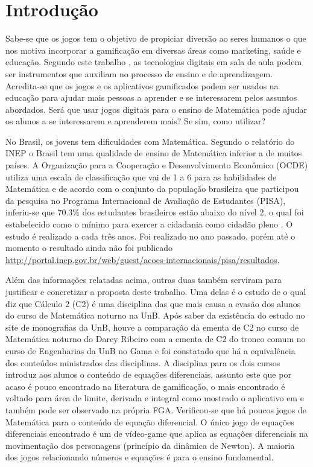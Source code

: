 \chapter[Introdução]{Introdução}


Sabe-se que os jogos tem o objetivo de propiciar diversão ao seres humanos o que nos motiva incorporar a gamificação em diversas áreas como marketing, saúde e educação. Segundo este trabalho \cite{revbibmatgam}, as tecnologias digitais em sala de aula podem ser instrumentos que auxiliam no processo de ensino e de aprendizagem. Acredita-se que os jogos e os aplicativos gamificados podem ser usados na educação para ajudar mais pessoas a aprender e se interessarem pelos assuntos abordados. Será que usar jogos digitais para o ensino de Matemática pode ajudar os alunos a se interessarem e aprenderem mais? Se sim, como utilizar? 

No Brasil, os jovens tem dificuldades com Matemática. Segundo o relatório do INEP \cite{inep2015nivelcidadania} o Brasil tem uma qualidade de ensino de Matemática inferior a de muitos países. A Organização para a Cooperação e Desenvolvimento Econômico (OCDE) utiliza uma escala de classificação que vai de 1 a 6 para as habilidades de Matemática e de acordo com o conjunto da população brasileira que participou da pesquisa no Programa Internacional de Avaliação de Estudantes (PISA), inferiu-se que 70.3\% dos estudantes brasileiros estão abaixo do nível 2, o qual foi estabelecido como o mínimo para exercer a cidadania como cidadão pleno \cite{inep2015nivelcidadania}.
O estudo é realizado a cada três anos. Foi realizado no ano passado, porém até o momento o resultado ainda não foi publicado \url{http://portal.inep.gov.br/web/guest/acoes-internacionais/pisa/resultados}.

Além das informações relatadas acima, outras duas também serviram para justificar e concretizar a proposta deste trabalho. Uma delas é o estudo de \cite{evasaoC2} o qual diz que Cálculo 2 (C2) é uma disciplina das que mais causa a evasão dos alunos do curso de Matemática noturno na UnB. Após saber da existência do estudo no site de monografias da UnB, houve a comparação da ementa de C2 no curso de Matemática noturno do Darcy Ribeiro com a ementa de C2 do tronco comum no curso de Engenharias da UnB no Gama e foi constatado que há a equivalência dos conteúdos ministrados das disciplinas. A disciplina para os dois cursos introduz aos alunos o conteúdo de equações diferenciais, assunto este que por acaso é pouco encontrado na literatura de gamificação, o mais encontrado é voltado para área de limite, derivada e integral como mostrado o aplicativo em \cite{appcalculo} e também pode ser observado na própria FGA. Verificou-se que há poucos jogos de Matemática para o conteúdo de equação diferencial. O único jogo de equações diferenciais encontrado é um de vídeo-game que aplica as equações diferenciais na movimentação dos personagens (princípio da dinâmica de Newton)\cite{videoGameED}. A maioria dos jogos relacionando números e equações é para o ensino fundamental.

